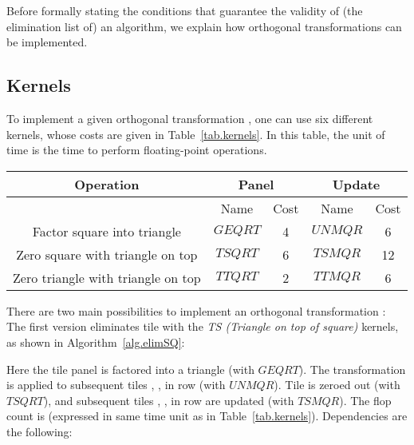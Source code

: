 \documentclass[a4paper,twopages]{article}
\newcommand{\GEQRT}{\ensuremath{\mathit{GEQRT}}\xspace}
\newcommand{\TSQRT}{\ensuremath{\mathit{TSQRT}}\xspace}
\newcommand{\UNMQR}{\ensuremath{\mathit{UNMQR}}\xspace}
\newcommand{\TSMQR}{\ensuremath{\mathit{TSMQR}}\xspace}
\newcommand{\TTQRT}{\ensuremath{\mathit{TTQRT}}\xspace}
\newcommand{\TTMQR}{\ensuremath{\mathit{TTMQR}}\xspace}
\begin{document}
Before formally stating the conditions that guarantee the validity of (the
elimination list of) an algorithm, we explain how orthogonal transformations
can be implemented.

\subsection{Kernels}
\label{sec:kernels}

To implement a given orthogonal transformation , one can use six different kernels, whose costs are given in
Table~\ref{tab.kernels}.  In this table, the unit of time is the time to
perform  floating-point operations.


\begin{table*}
\centering
\begin{tabular}{|c||c|c||c|c|}
  \hline
  Operation & \multicolumn{2}{|c||}{Panel} & \multicolumn{2}{c|}{Update} \\ \hline
  & Name & Cost & Name & Cost \\ \hline
  Factor square into triangle        & \GEQRT & 4 & \UNMQR & 6  \\ \hline
  Zero square with triangle on top   & \TSQRT & 6 & \TSMQR & 12 \\ \hline
  Zero triangle with triangle on top & \TTQRT & 2 & \TTMQR & 6  \\ \hline
\end{tabular}
\caption{Kernels for tiled QR. The unit of time is  floating-point operations, where  is the blocksize.}
\label{tab.kernels}
\end{table*}


There are two main possibilities to implement an orthogonal transformation : The first version eliminates tile  with the \emph{TS (Triangle
on top of square)} kernels, as shown in Algorithm~\ref{alg.elimSQ}:

\begin{algorithm}[htbp]
  \DontPrintSemicolon
  \;
  \;
\caption{Elimination  via \emph{TS (Triangle on top of square)} kernels.}
\label{alg.elimSQ}
\end{algorithm}

Here the tile panel  is factored into a triangle (with \GEQRT).
The transformation is applied to subsequent tiles , , in row
 (with \UNMQR). Tile  is zeroed out (with \TSQRT), and
subsequent tiles , , in row  are updated (with \TSMQR). The flop
count is  (expressed in same time unit as in
Table~\ref{tab.kernels}).  Dependencies are the following:
\end{document}
